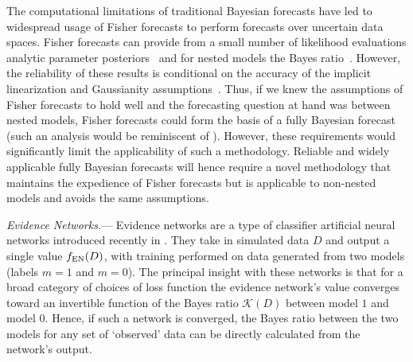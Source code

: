 \documentclass[twocolumn,english,aps,prl,amsmath,amssymb,reprint,footinbib,floatfix,showkeys]{revtex4-2}
\newcommand{\br}{\mathcal{K}}
\newcommand{\enf}{f_{\rm EN}(D)}
\begin{document}
The computational limitations of traditional Bayesian forecasts have led to widespread usage of Fisher forecasts to perform forecasts over uncertain data spaces.
Fisher forecasts can provide from a small number of likelihood evaluations analytic parameter posteriors~\citep[e.g.][]{Tegmark_1997} and for nested models the Bayes ratio~\citep{Dickey_1971, Verdinelli_1995, Trotta_2007}.
However, the reliability of these results is conditional on the accuracy of the implicit linearization and Gaussianity assumptions~\citep[see][]{Perotto_2006, Wolz_2012}.
Thus, if we knew the assumptions of Fisher forecasts to hold well and the forecasting question at hand was between nested models, Fisher forecasts could form the basis of a fully Bayesian forecast (such an analysis would be reminiscent of \citet{Trotta_2007b}).
However, these requirements would significantly limit the applicability of such a methodology. 
Reliable and widely applicable fully Bayesian forecasts will hence require a novel methodology that maintains the expedience of Fisher forecasts but is applicable to non-nested models and avoids the same assumptions.





\textit{Evidence Networks.}---
Evidence networks are a type of classifier artificial neural networks introduced recently in \citet{EN}.
They take in simulated data $D$ and output a single value $\enf$, with training performed on data generated from two models (labels $m = 1$ and $m = 0$).
The principal insight with these networks is that for a broad category of choices of loss function the evidence network's value converges toward an invertible function of the Bayes ratio $\br(D)$ between model $1$ and model $0$.
Hence, if such a network is converged, the Bayes ratio between the two models for any set of `observed' data can be directly calculated from the network's output. 
\end{document}
